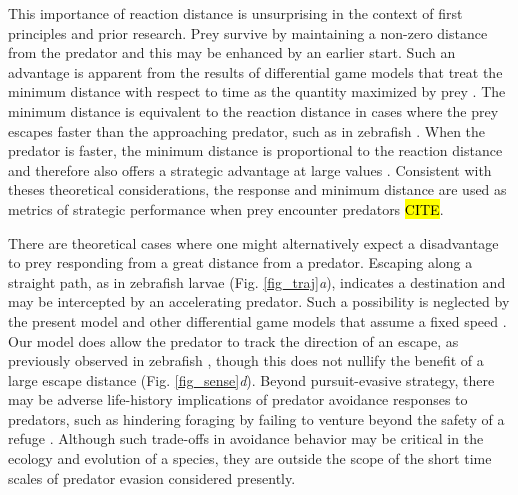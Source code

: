 \documentclass[]{rsos}%
\begin{document}
This importance of reaction distance is unsurprising in the context of first principles and prior research.
Prey survive by maintaining a non-zero distance from the predator and this may be enhanced by an earlier start.
Such an advantage is apparent from the results of differential game models that treat the minimum distance with respect to time as the quantity maximized by prey \cite{Weihs:1984tb, Isaacs:1965uz}.
The minimum distance is equivalent to the reaction distance in cases where the prey escapes faster than the approaching predator, such as in zebrafish \cite{Soto:2015cj}.
When the predator is faster, the minimum distance is proportional to the reaction distance and therefore also offers a strategic advantage at large values \cite{Weihs:1984tb}. 
Consistent with theses theoretical considerations, the response and minimum distance are used as metrics of strategic performance when prey encounter predators \hl{CITE}.

There are theoretical cases where one might alternatively expect a disadvantage to prey responding from a great distance from a predator. 
Escaping along a straight path, as in zebrafish larvae (Fig. \ref{fig_traj}\textit{a}), indicates a destination and may be intercepted by an accelerating predator. 
Such a possibility is neglected by the present model and other differential game models that assume a fixed speed \cite{Weihs:1984tb, Isaacs:1965uz}.
Our model does allow the predator to track the direction of an escape, as previously observed in zebrafish \cite{Stewart:2013bha}, though this does not nullify the benefit of a large escape distance (Fig. \ref{fig_sense}\textit{d}).
Beyond pursuit-evasive strategy, there may be adverse life-history implications of predator avoidance responses to predators, such as hindering foraging by failing to venture beyond the safety of a refuge \cite{Cooper:2015vf}. 
Although such trade-offs in avoidance behavior may be critical in the ecology and evolution of a species, they are outside the scope of the short time scales of predator evasion considered presently. 
\end{document}
